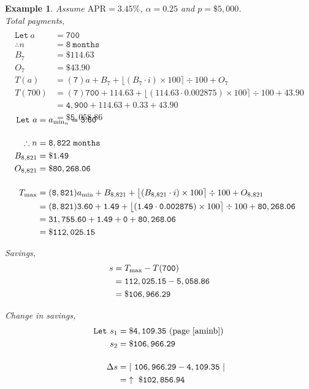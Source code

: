 \documentclass[12pt,letterpaper,oneside]{article}
\newtheorem{example}{Example}[section]
\theoremstyle{remark} %
\begin{document}
	\newpage
	\begin{example}
	Assume $\mbox{APR}=3.45\%$, $\alpha=0.25$ and $p=\$5,000$.\\[12pt]
	Total payments,
	\begin{align*}
	\\\mathtt{Let\ } a&=\mathtt{700}\\[12pt]
	\therefore n&=\mathtt{8\ months}\\
	B_{7}&=\mathtt{\$114.63}\\
	O_{7}&=\mathtt{\$43.90}\\[12pt]		
	T(a)&=(\mathtt{7}) a+B_{7}+\big\lfloor{\left(B_{7}\cdot i\right)\times 100}\big\rceil\div 100+O_{7}\\
	T(700)&=(\mathtt{7}) \mathtt{700}+\mathtt{114.63}+\big\lfloor{\left(\mathtt{114.63}\cdot \mathtt{0.002875}\right)\times 100}\big\rceil\div 100+\mathtt{43.90}\\
	&=\mathtt{4,900}+\mathtt{114.63}+\mathtt{0.33}+\mathtt{43.90}\\
	&=\mathtt{\$5,058.86}
	\end{align*}

	\label{aminc}
	\begin{align*}\\[-36pt]
	\mathtt{Let\ } a&=a_{\rm{min_{\mathnormal{n}}}}=\mathtt{3.60}\\[12pt]
	\therefore n&=\mathtt{8,822\ months}\\
	B_{8,821}&=\mathtt{\$1.49}\\
	O_{8,821}&=\mathtt{\$80,268.06}\\[12pt]		
	T_{\rm{max}}&=(\mathtt{8,821}) a_{\rm{min}}+B_{8,821}+\big\lfloor{\left(B_{8,821}\cdot i\right)\times 100}\big\rceil\div 100+O_{8,821}\\
	&=(\mathtt{8,821}) \mathtt{3.60}+\mathtt{1.49}+\big\lfloor{\left(\mathtt{1.49}\cdot \mathtt{0.002875}\right)\times 100}\big\rceil\div 100+\mathtt{80,268.06}\\
	&=\mathtt{31,755.60}+\mathtt{1.49}+\mathtt{0}+\mathtt{80,268.06}\\
	&=\mathtt{\$112,025.15}
	\end{align*}

	\vspace{12pt}
	Savings,
	\begin{align*}
	s&=T_{\rm{max}}-T(\mathtt{700})\\
	&=\mathtt{112,025.15}-\mathtt{5,058.86}\\
	&=\mathtt{\$106,966.29}
	\end{align*}

	Change in savings,
	\begin{align*}
	\mathtt{Let\ }s_{1}&=\mathtt{\$4,109.35}\ \mbox{(page\ \pageref{aminb})}\\
	s_{2}&=\mathtt{\$106,966.29}\\[12pt]
	\Delta s&=\left|\ \mathtt{106,966.29}-\mathtt{4,109.35}\ \right|\\
	&=\mathtt{\uparrow\ \$102,856.94}
	\end{align*}	
	\end{example}
\end{document}
